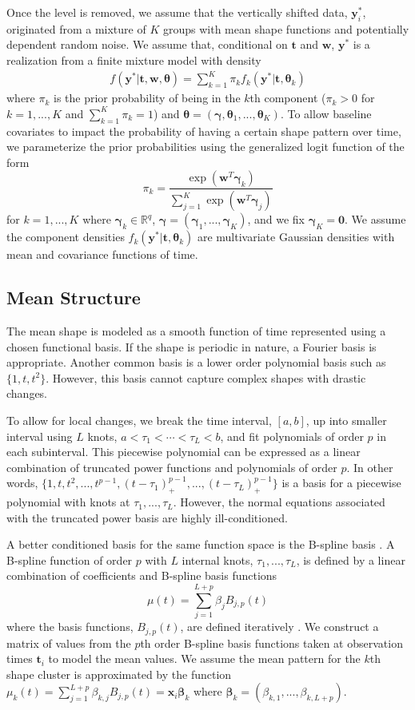 \documentclass[12pt]{article}
\newcommand{\B}[0]{\mathbf}
\newcommand{\bs}[0]{\boldsymbol}
\begin{document}
Once the level is removed, we assume that the vertically shifted data, $\B y_{i}^{*}$, originated from a mixture of $K$ groups with mean shape functions and potentially dependent random noise. We assume that, conditional on $\B t$ and $\B w$, $\B y^{*}$ is a realization from a finite mixture model with density
\begin{align*}
 f(\B y^{*}|\B t,\B w,\bs\theta) =  \sum^{K}_{k=1}\pi_{k}f_{k}( \B y^{*}|\B t,\bs\theta_{k})
\end{align*}
where $\pi_{k}$ is the prior probability of being in the $k$th component ($\pi_{k}>0$ for $k=1,...,K$ and $\sum^{K}_{k=1}\pi_{k}=1$) and $\bs\theta = (\bs\gamma,\bs\theta_{1},...,\bs\theta_{K})$. To allow baseline covariates to impact the probability of having a certain shape pattern over time, we parameterize the prior probabilities using the generalized logit function of the form
$$\pi_{k}=\frac{\exp(\B w^{T}\bs\gamma_{k})}{\sum_{j=1}^{K}\exp(\B w^{T}\bs\gamma_{j})}$$ 
for $k=1,...,K$ where $\bs \gamma_{k}\in\mathbb{R}^{q}$, $\bs\gamma = (\bs\gamma_{1},...,\bs\gamma_{K})$, and we fix $\bs\gamma_{K}=\B 0$. We assume the component densities $f_{k}(\B y^{*}|\B t,\bs\theta_{k})$ are multivariate Gaussian densities with mean and covariance functions of time.

\subsection{Mean Structure}
The mean shape is modeled as a smooth function of time represented using a chosen functional basis. If the shape is periodic in nature, a Fourier basis is appropriate. Another common basis is a lower order polynomial basis such as $\{1, t, t^{2}\}$. However, this basis cannot capture complex shapes with drastic changes. 

To allow for local changes, we break the time interval, $[a,b]$, up into smaller interval using $L$ knots, $a<\tau_{1}<\cdots<\tau_{L}<b$, and fit polynomials of order $p$ in each subinterval. This piecewise polynomial can be expressed as a linear combination of truncated power functions and polynomials of order $p$. In other words,
$\{1,t,t^{2},...,t^{p-1},(t-\tau_{1})_{+}^{p-1},...,(t-\tau_{L})_{+}^{p-1}\}$
is a basis for a piecewise polynomial with knots at $\tau_{1},...,\tau_{L}$. However, the normal equations associated with the truncated power basis are highly ill-conditioned. 

A better conditioned basis for the same function space is the B-spline basis \cite{deboor1978, schumaker1981,curry1966, de1976}. A B-spline function of order $p$ with $L$ internal knots, $\tau_{1},...,\tau_{L}$, is defined by a linear combination of coefficients and B-spline basis functions
$$\mu(t) = \sum^{L+p}_{j=1} \beta_j B_{j,p}(t)$$
where the basis functions, $B_{j,p}(t)$, are defined iteratively \cite{deboor1972,cox1972}. We construct a matrix  of values from the $p$th order B-spline basis functions taken at observation times $\B t_{i}$ to model the mean values. We assume the mean pattern for the $k$th shape cluster is approximated by the function $\mu_{k}(t)=\sum^{L+p}_{j=1} \beta_{k,j} B_{j,p}(t) = \B x_{i}\bs\beta_{k}$ where $\bs\beta_{k}=(\beta_{k,1},...,\beta_{k, L+p}).$  
\end{document}
